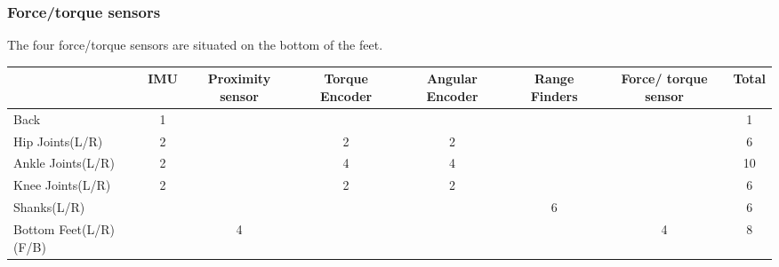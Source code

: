 \subsubsection{Force/torque sensors}
The four force/torque sensors are situated on the bottom of the feet.

\begin{table}[]
	\centering
	\begin{tabular}{|l|c|c|c|c|c|c|c|}
		\hline
		& \multicolumn{1}{l|}{IMU} & \multicolumn{1}{p{15mm}|}{Proximity sensor} & \multicolumn{1}{p{15mm}|}{Torque Encoder} & \multicolumn{1}{p{15mm}|}{Angular Encoder} & \multicolumn{1}{p{15mm}|}{Range Finders} & \multicolumn{1}{p{15mm}|}{Force/ torque sensor} & \multicolumn{1}{l|}{Total} \\ \hline
		Back                  & 1                        &                                       &                                     &                                      &                                    &                                          & 1                          \\ \hline
		Hip Joints(L/R)       & 2                        &                                       & 2                                   & 2                                    &                                    &                                          & 6                          \\ \hline
		Ankle Joints(L/R)     & 2                        &                                       & 4                                   & 4                                    &                                    &                                          & 10                         \\ \hline
		Knee Joints(L/R)      & 2                        &                                       & 2                                   & 2                                    &                                    &                                          & 6                          \\ \hline
		Shanks(L/R)           &                          &                                       &                                     &                                      & 6                                  &                                          & 6                          \\ \hline
		Bottom Feet(L/R)(F/B) &                          & 4                                     &                                     &                                      &                                    & 4                                        & 8                          \\ \hline

\end{tabular}
\end{table}
